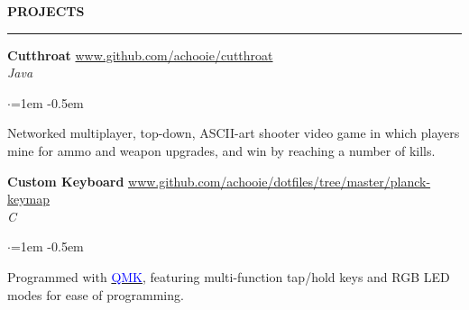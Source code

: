 \documentclass[10pt, a4paper]{article}
\newenvironment{aSection}[1]{
    \medskip \textbf{\uppercase{#1}}
    \smallskip
    \hrule
    \begin{list}{}{
            \setlength{\leftmargin}{1.5em}
        }
    \item[]
    }{
    \end{list}
}
\newenvironment{aSubsection}[4]{
    {#1} \hfill {#2} \\
    \textit{#3} \hfill \textit{#4}
    \smallskip
    \begin{list}{$\cdot$}{\leftmargin=1em}
    \itemsep -0.5em \vspace{-0.5em}
    }{
    \end{list}
    \vspace{0.5em}
}
\begin{document}
\begin{aSection}{Projects}
    \begin{aSubsection}
        {\textbf{Cutthroat}}
        {\textcolor{blue}{\url{www.github.com/achooie/cutthroat}}}
        {Java}{}
    \item[] Networked multiplayer, top-down, ASCII-art shooter video game in which players mine for
        ammo and weapon upgrades, and win by reaching a number of kills.
    \end{aSubsection}

    \begin{aSubsection}
        {\textbf{Custom Keyboard}}
        {\textcolor{blue}{\url{www.github.com/achooie/dotfiles/tree/master/planck-keymap}}}
        {C}{}
    \item[] Programmed with \href{www.github.com/achooie/qmk_firmware}{\textcolor{blue}{QMK}},
        featuring multi-function tap/hold keys and RGB LED modes for ease of programming.
    \end{aSubsection}
\end{aSection}
\end{document}
